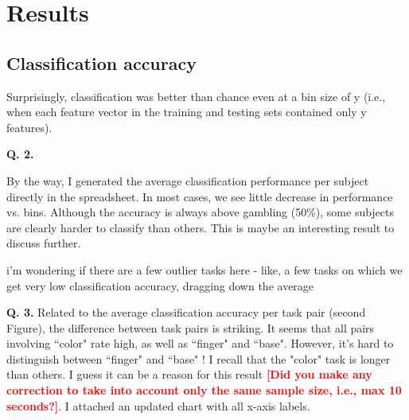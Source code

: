 \section{Results}

\subsection{Classification accuracy}



Surprisingly, classification was better than chance even at a bin size of y (i.e., when each feature vector in the training and testing sets contained only y features).


{\bf Q. 2.}

    By the way, I generated the average classification performance per subject directly in the spreadsheet. In most cases, we see little decrease in performance vs. bins. Although the accuracy is always above gambling (50\%), some subjects are clearly harder to classify than others. This is maybe an interesting result to discuss further.



\begin{figure}
\begin{center}
\caption{ }
\label{ }
\end{center}
\end{figure}


i'm wondering if there are a few outlier tasks here - like, a few tasks on which we get very low classification accuracy, dragging down the average
 

{\bf Q. 3.} Related to the average classification accuracy per task pair (second Figure), the difference between task pairs is striking. It seems that all pairs involving ``color" rate high, as well as ``finger" and ``base". However, it's hard to distinguish between ``finger" and ``base" ! I recall that the "color" task is longer than others. I guess it can be a reason for this result \textcolor{red}{\bf [Did you make any correction to take into account only the same sample size, i.e., max 10 seconds?]}. I attached an updated chart with all x-axis labels.

\begin{figure}
\begin{center}
\caption{ }
\label{ }
\end{center}
\end{figure}


